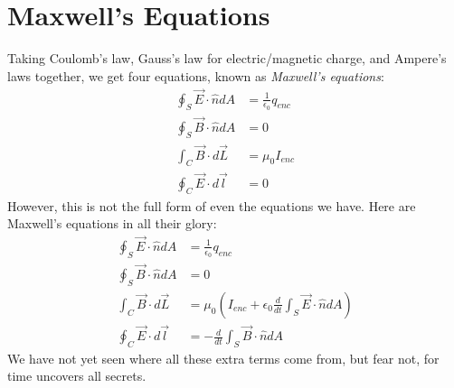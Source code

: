 \documentclass[nobib]{tufte-handout}
\begin{document}
\section{Maxwell's Equations}
Taking Coulomb's law, Gauss's law for electric/magnetic charge, and Ampere's laws 
together, we get four equations, known 
as \emph{Maxwell's equations}: 
\begin{align*}
    \oint_S \vec{E} \cdot \hat{n} dA &= \frac{1}{\epsilon_0} q_{enc} \\
    \oint_S \vec{B} \cdot \hat{n} dA &= 0 \\
    \int_C \vec{B} \cdot d\vec{L} &= \mu_0 I_{enc} \\
    \oint_C \vec{E} \cdot d\vec{l} &= 0
\end{align*}
However, this is not the full form 
of even the equations we have. Here 
are Maxwell's equations in all their glory: 
\begin{align*}
    \oint_S \vec{E} \cdot \hat{n} dA &= \frac{1}{\epsilon_0} q_{enc} \\
    \oint_S \vec{B} \cdot \hat{n} dA &= 0 \\
    \int_C \vec{B} \cdot d\vec{L} &= \mu_0 \left(I_{enc} + \epsilon_0 \frac{d}{dt} \int_S \vec{E} \cdot \hat{n} dA \right) \\
    \oint_C \vec{E} \cdot d\vec{l} &= -\frac{d}{dt} \int_S \vec{B} \cdot \hat{n} dA 
\end{align*}
We have not yet seen where all these extra 
terms come from, but fear not, for 
time uncovers all secrets. 
\end{document}
